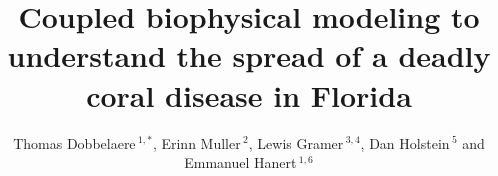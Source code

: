 \documentclass[utf8]{frontiersSCNS}
\def\firstAuthorLast{Dobbelaere {et~al.}} %
\def\Authors{Thomas Dobbelaere\,$^{1,*}$, Erinn Muller\,$^{2}$, Lewis Gramer\,$^{3,4}$, Dan Holstein\,$^{5}$  and Emmanuel Hanert\,$^{1,6}$}
\begin{document}
\onecolumn
{}

\title[Modeling the spread of SCTLD in Florida]{Coupled biophysical modeling to understand the spread of a deadly coral disease in Florida}

\author[\firstAuthorLast ]{\Authors} %
\address{} %
\correspondance{} %
\extraAuth{}

\maketitle
\end{document}

